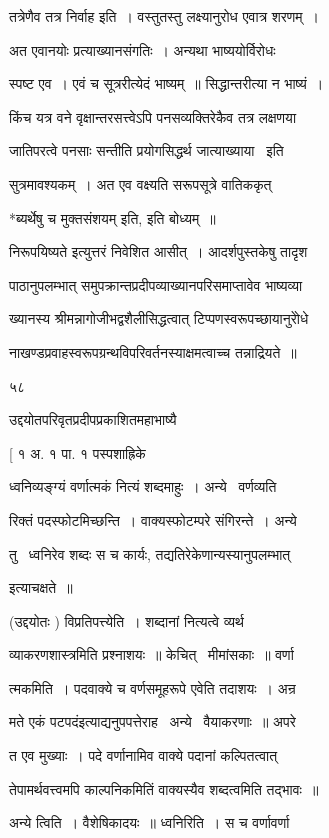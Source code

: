 \documentclass[11pt, openany]{book}
\begin{document}
तत्रेणैव तत्र निर्वाह इति~। वस्तुतस्तु लक्ष्यानुरोध एवात्र शरणम्~। 

अत एवानयोः प्रत्याख्यानसंगतिः~। अन्यथा भाष्ययोर्विरोधः 

स्पष्ट एव~। एवं च सूत्ररीत्येदं भाष्यम्~॥ सिद्धान्तरीत्या न भाष्यं~। 

किंच यत्र वने वृक्षान्तरसत्त्वेऽपि पनसव्यक्तिरेकैव तत्र लक्षणया 

जातिपरत्वे पनसाः सन्तीति प्रयोगसिद्धर्थ जात्याख्याया \textendash\  इति 

सुत्रमावश्यकम्~। अत एव वक्ष्यति सरूपसूत्रे वातिककृत् \textendash\ 

*ब्यर्थेषु च मुक्तसंशयम् इति, इति बोध्यम्~॥ 

{\qt निरूपयिष्यते} इत्युत्तरं निवेशित आसीत्~। आदर्शपुस्तकेषु तादृश \textendash\ 

पाठानुपलम्भात् समुपक्रान्तप्रदीपव्याख्यानपरिसमाप्तावेव भाष्यव्या \textendash\ 

ख्यानस्य श्रीमन्नागोजीभद्वशैलीसिद्धत्वात् टिप्पणस्वरूपच्छायानुरोेधे \textendash\ 

नाखण्डप्रवाहस्वरूपग्रन्थविपरिवर्तनस्याक्षमत्वाच्च तन्नाद्रियते~॥ 

५८ 

उद्दयोतपरिवृतप्रदीपप्रकाशितमहाभाष्यै \textendash\ 

[ १ अ. १ पा. १ पस्पशाह्रिके 



ध्वनिव्यङ्ग्यं वर्णात्मकं नित्यं शब्दमाहुः~। अन्ये \textendash\ वर्णव्यति \textendash\ 

रिक्तं पदस्फोटमिच्छन्ति~। वाक्यस्फोटम्परे संगिरन्ते~। अन्ये 

तु \textendash\ ध्वनिरेव शब्दः स च कार्यः, तद्यतिरेकेणान्यस्यानुपलम्भात् \textendash\ 

इत्याचक्षते~॥ 

(उद्दयोतः ) विप्रतिपत्त्येति~। शब्दानां नित्यत्वे व्यर्थ 

व्याकरणशास्त्रमिति प्रश्नाशयः~॥ केचित् \textendash\ मीमांसकाः~॥ वर्णा \textendash\ 

त्मकमिति~। पदवाक्ये च वर्णसमूहरूपे एवेति तदाशयः~। अन्र 

{\qt मते एकं पटपदं}इत्याद्यनुपपत्तेराह \textendash\ अन्ये \textendash\ वैयाकरणाः~॥ अपरे \textendash\ 

त एव मुख्याः~। पदे वर्णानामिव वाक्ये पदानां कल्पितत्वात् 

तेपामर्थवत्त्वमपि काल्पनिकमितिं वाक्यस्यैव शब्दत्वमिति तद्भावः~॥ 

अन्ये त्विति~। वैशेषिकादयः~॥ ध्वनिरिति~। स च वर्णावर्णा \textendash\ 
\end{document}
